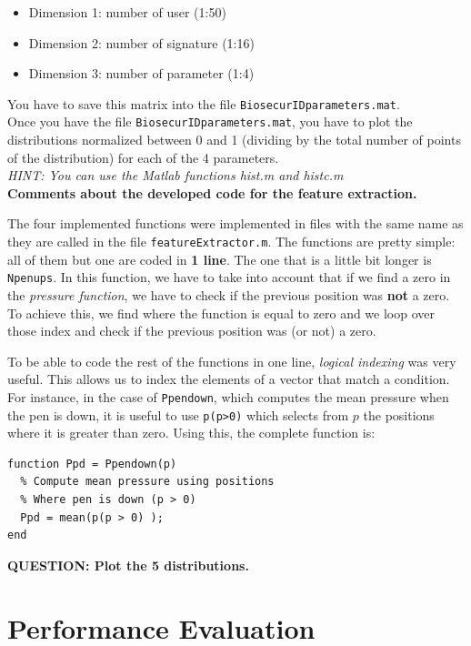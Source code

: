 \documentclass[a4paper]{article}
\def\inline{\lstinline[basicstyle=\ttfamily,keywordstyle={}]}
\begin{document}
{\begin{itemize}
\item	Dimension 1: number of user (1:50)
\item	Dimension 2: number of signature (1:16)
\item Dimension 3: number of parameter (1:4)
\end{itemize}

You have to save this matrix into the file \inline{BiosecurIDparameters.mat}.\\

Once you have the file \inline{BiosecurIDparameters.mat}, you have to plot the distributions normalized between 0 and 1 (dividing by the total number of points of the distribution) for each of the 4 parameters. \\
\emph{HINT: You can use the Matlab functions hist.m and histc.m}\\

\textbf{Comments about the developed code for the feature extraction.}

The four implemented functions were implemented in files with the same name as they are called in the file \inline{featureExtractor.m}. The functions are pretty simple: all of them but one are coded in \textbf{1 line}. The one that is a little bit longer is \inline{Npenups}. In this function, we have to take into account that if we find a zero in the \emph{pressure function}, we have to check if the previous position was \textbf{not} a zero. To achieve this, we find where the function is equal to zero and we loop over those index and check if the previous position was (or not) a zero.

To be able to code the rest of the functions in one line, \emph{logical indexing} was very useful. This allows us to index the elements of a vector that match a condition. For instance, in the case of \inline{Ppendown}, which computes the mean pressure when the pen is down, it is useful to use \inline{p(p>0)} which selects from \(p\) the positions where it is greater than zero. Using this, the complete function is:

\begin{verbatim}
function Ppd = Ppendown(p)
  % Compute mean pressure using positions 
  % Where pen is down (p > 0)
  Ppd = mean(p(p > 0) );
end
\end{verbatim}

\textbf{QUESTION:  Plot the 5 distributions.}


\section{Performance Evaluation}

}
\end{document}
